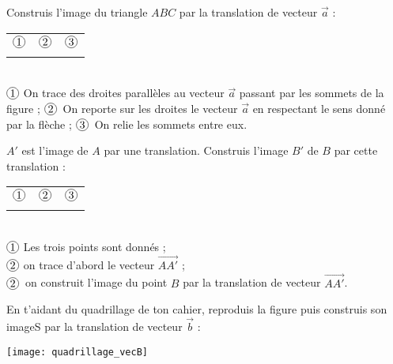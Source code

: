 \begin{methode*1}[La translation]
\begin{exemple*1}
Construis l'image du triangle $ABC$ par la translation de vecteur $\vec{a}$ : \hfill
\begin{tabularx}{\linewidth}{X|X|X}
\textcolor{H1}{$\circled{1}$} & \textcolor{H1}{$\circled{2}$} & \textcolor{H1}{$\circled{3}$} \\
 &  &  \\
\end{tabularx} \\
\textcolor{H1}{$\circled{1}$} On trace des droites parallèles au vecteur $\vec{a}$ passant par les sommets de la figure ;
\textcolor{H1}{$\circled{2}$} On reporte sur les droites le vecteur $\vec{a}$ en respectant le sens donné par la flèche ;
\textcolor{H1}{$\circled{3}$} On relie les sommets entre eux.
 \end{exemple*1}
 
 \begin{exemple*1}
$A'$ est l'image de $A$ par une translation. Construis l'image $B'$ de $B$ par cette translation :
\begin{tabularx}{\linewidth}{X|X|X}
\textcolor{H1}{$\circled{1}$} & \textcolor{H1}{$\circled{2}$} &\textcolor{H1}{$\circled{3}$} \\
 &   & \\ 
\end{tabularx} \\
\textcolor{H1}{$\circled{1}$} Les trois points sont donnés ;\\
\textcolor{H1}{$\circled{2}$} on trace d'abord le vecteur $\overrightarrow{AA'}$ ;\\
\textcolor{H1}{$\circled{2}$} on construit l'image du point $B$ par la translation de vecteur $\overrightarrow{AA'}$.
\end{exemple*1}

 \exercice
En t'aidant du quadrillage de ton cahier, reproduis la figure puis construis son imageS par la translation de vecteur $\overrightarrow{b}$ :
\begin{center} \texttt{[image: quadrillage\_vecB]} \end{center}

 \end{methode*1}
 
